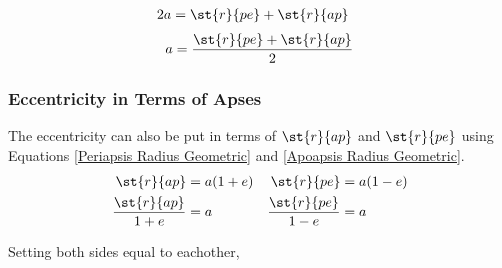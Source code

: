 \documentclass[../basicOrbitalDynamics.tex]{subfiles}
\begin{document}
\begin{align*}
    2a & = \st{r}{pe}+\st{r}{ap}
\end{align*}
\begin{equation}\label{SMA in terms of apses}
    a = \frac{\st{r}{pe}+\st{r}{ap}}{2}
\end{equation}

\subsubsection{Eccentricity in Terms of Apses}

The eccentricity can also be put in terms of $\st{r}{ap}$ and $\st{r}{pe}$ using Equations \eqref{Periapsis Radius Geometric} and \eqref{Apoapsis Radius Geometric}.
\begin{align*}
    \st{r}{ap}             & =a(1+e) & \st{r}{pe}             & =a(1-e) \\
    \frac{\st{r}{ap}}{1+e} & =a      & \frac{\st{r}{pe}}{1-e} & =a      \\
\end{align*}

Setting both sides equal to eachother,
\end{document}
